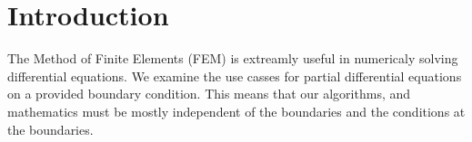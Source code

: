 \documentclass[../fem.tex]{subfiles}
\begin{document}
\section{Introduction}%
\label{sec:introduction}

The Method of Finite Elements (FEM) is extreamly useful in numericaly solving
differential equations. We examine the use casses for partial differential
equations on a provided boundary condition. This means that our algorithms, and
mathematics must be mostly independent of the boundaries and the conditions at
the boundaries.
\end{document}
